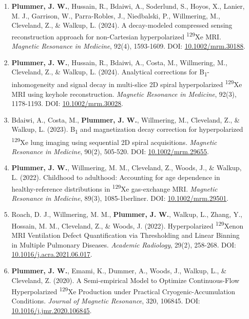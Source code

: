 \documentclass[11pt,]{scrartcl}
\begin{document}
\begin{enumerate}
    \item \textbf{Plummer, J. W.}, Hussain, R., Bdaiwi, A., Soderlund, S., Hoyos, X., Lanier, M. J., Garrison, W., Parra-Robles, J., Niedbalski, P., Willmering, M., Cleveland, Z., \& Walkup, L. (2024). A decay-modeled compressed sensing reconstruction approach for non-Cartesian hyperpolarized \textsuperscript{129}Xe MRI. \textit{Magnetic Resonance in Medicine}, 92(4), 1593-1609. DOI: \href{https://doi.org/10.1002/mrm.30188}{10.1002/mrm.30188}.

    \item \textbf{Plummer, J. W.}, Hussain, R., Bdaiwi, A., Costa, M., Willmering, M., Cleveland, Z., \& Walkup, L. (2024). Analytical corrections for B\textsubscript{1}-inhomogeneity and signal decay in multi-slice 2D spiral hyperpolarized \textsuperscript{129}Xe MRI using keyhole reconstruction. \textit{Magnetic Resonance in Medicine}, 92(3), 1178-1193. DOI: \href{https://doi.org/10.1002/mrm.30028}{10.1002/mrm.30028}.
    
    \item Bdaiwi, A., Costa, M., \textbf{Plummer, J. W.}, Willmering, M., Cleveland, Z., \& Walkup, L. (2023). B\textsubscript{1} and magnetization decay correction for hyperpolarized \textsuperscript{129}Xe lung imaging using sequential 2D spiral acquisitions. \textit{Magnetic Resonance in Medicine}, 90(2), 505-520. DOI: \href{https://doi.org/10.1002/mrm.29655}{10.1002/mrm.29655}.
    
    \item \textbf{Plummer, J. W.}, Willmering, M. M., Cleveland, Z., Woods, J., \& Walkup, L. (2022). Childhood to adulthood: Accounting for age dependence in healthy-reference distributions in \textsuperscript{129}Xe gas-exchange MRI. \textit{Magnetic Resonance in Medicine}, 89(3), 1085-1berliner. DOI: \href{https://doi.org/10.1002/mrm.29501}{10.1002/mrm.29501}.
    
    \item Roach, D. J., Willmering, M. M., \textbf{Plummer, J. W.}, Walkup, L., Zhang, Y., Hossain, M. M., Cleveland, Z., \& Woods, J. (2022). Hyperpolarized \textsuperscript{129}Xenon MRI Ventilation Defect Quantification via Thresholding and Linear Binning in Multiple Pulmonary Diseases. \textit{Academic Radiology}, 29(2), 258-268. DOI: \href{https://doi.org/10.1016/j.acra.2021.06.017}{10.1016/j.acra.2021.06.017}.
    
    \item \textbf{Plummer, J. W.}, Emami, K., Dummer, A., Woods, J., Walkup, L., \& Cleveland, Z. (2020). A Semi-empirical Model to Optimize Continuous-Flow Hyperpolarized \textsuperscript{129}Xe Production under Practical Cryogenic-Accumulation Conditions. \textit{Journal of Magnetic Resonance}, 320, 106845. DOI: \href{https://doi.org/10.1016/j.jmr.2020.106845}{10.1016/j.jmr.2020.106845}.

\end{enumerate}
\end{document}
